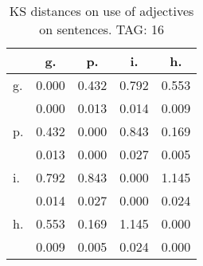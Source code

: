 \begin{table}[h!]
\begin{center}
\begin{tabular}{| l | c | c | c | c |}\hline
 & g. & p. & i. & h. \\\hline
g. & 0.000  & 0.432  & 0.792  & 0.553 \\\hline
 & 0.000  & 0.013  & 0.014  & 0.009 \\\hline
p. & 0.432  & 0.000  & 0.843  & 0.169 \\\hline
 & 0.013  & 0.000  & 0.027  & 0.005 \\\hline
i. & 0.792  & 0.843  & 0.000  & 1.145 \\\hline
 & 0.014  & 0.027  & 0.000  & 0.024 \\\hline
h. & 0.553  & 0.169  & 1.145  & 0.000 \\\hline
 & 0.009  & 0.005  & 0.024  & 0.000 \\\hline
\end{tabular}
\caption{KS distances on use of adjectives on sentences. TAG: 16}
\end{center}
\end{table}